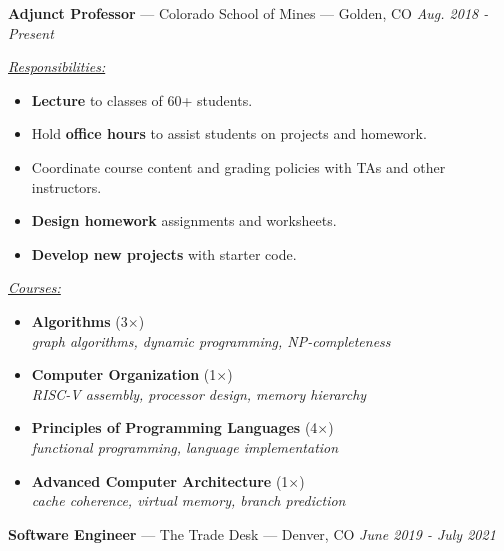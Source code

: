 \documentclass[10pt,letterpaper]{article}
\begin{document}
{\fontsize{11}{0}
\textbf{Adjunct Professor} --- Colorado School of Mines --- Golden, CO}
\hfill \textit{Aug. 2018 - Present}

\vspace{4pt}
\begin{minipage}[t]{0.47\linewidth}
    \textit{\underline{Responsibilities:}}
    \begin{itemize}[topsep=5pt]
        \item \textbf{Lecture} to classes of 60+ students.
        \item Hold \textbf{office hours} to assist students on projects and
            homework.
        \item Coordinate course content and grading policies with TAs and other
            instructors.
        \item \textbf{Design homework} assignments and worksheets.
        \item \textbf{Develop new projects} with starter code.
    \end{itemize}
\end{minipage}\hfill%
\begin{minipage}[t]{0.53\linewidth}
    \textit{\underline{Courses:}}
    \begin{itemize}[topsep=5pt]
        \item \textbf{Algorithms} (3$\times$) \\
            \textit{graph algorithms, dynamic programming, NP-completeness}
        \item \textbf{Computer Organization} (1$\times$) \\
            \textit{RISC-V assembly, processor design, memory hierarchy}
        \item \textbf{Principles of Programming Languages} (4$\times$) \\
            \textit{functional programming, language implementation}
        \item \textbf{Advanced Computer Architecture} (1$\times$) \\
            \textit{cache coherence, virtual memory, branch prediction}
    \end{itemize}
\end{minipage}

\vspace{5pt}
{\fontsize{11}{0}
\textbf{Software Engineer} --- The Trade Desk --- Denver, CO}
\hfill \textit{June 2019 - July 2021}
\end{document}
